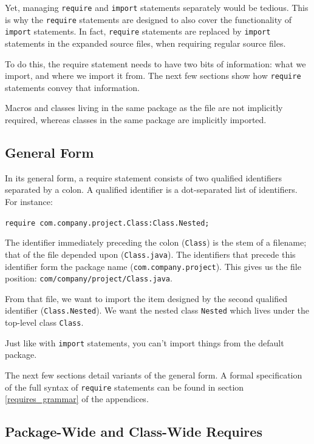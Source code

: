 Yet, managing \texttt{require} and \texttt{import} statements separately would
be tedious. This is why the \texttt{require} statements are designed to also
cover the functionality of \texttt{import} statements. In fact, \texttt{require}
statements are replaced by \texttt{import} statements in the expanded source
files, when requiring regular source files.

To do this, the require statement needs to have two bits of information: what we
import, and where we import it from. The next few sections show how
\texttt{require} statements convey that information.

Macros and classes living in the same package as the file are not implicitly
required, whereas classes in the same package are implicitly imported.

\subsection{General Form}

In its general form, a require statement consists of two qualified identifiers
separated by a colon. A qualified identifier is a dot-separated list of
identifiers. For instance:

\texttt{require com.company.project.Class:Class.Nested;}

The identifier immediately preceding the colon (\texttt{Class}) is the stem of a
filename; that of the file depended upon (\texttt{Class.java}). The identifiers
that precede this identifier form the package name
(\texttt{com.company.project}). This gives us the file position:
\texttt{com/company/project/Class.java}.

From that file, we want to import the item designed by the second qualified
identifier (\texttt{Class.Nested}). We want the nested class \texttt{Nested}
which lives under the top-level class \texttt{Class}.

Just like with \texttt{import} statements, you can't import things from the
default package.

The next few sections detail variants of the general form. A formal
specification of the full syntax of \texttt{require} statements can be found in
section \ref{requires_grammar} of the appendices.

\subsection{Package-Wide and Class-Wide Requires}

